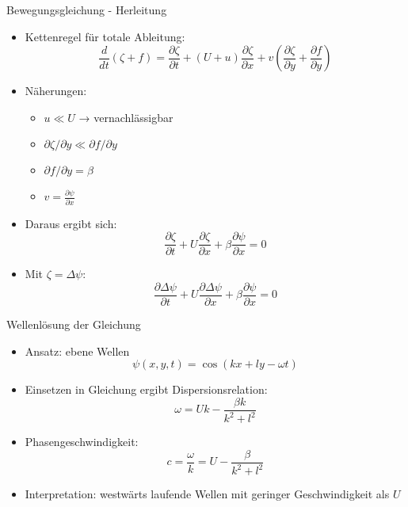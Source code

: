 \begin{frame}{Bewegungsgleichung - Herleitung}
	\begin{itemize}
		\item Kettenregel für totale Ableitung:
		      \[
			      \frac{d}{dt} (\zeta + f)
			      =
			      \frac{\partial \zeta}{\partial t}
			      + (U+u) \frac{\partial \zeta}{\partial x}
			      + v \left( \frac{\partial \zeta}{\partial y} + \frac{\partial f}{\partial y} \right)
		      \]
		\item Näherungen:
		      \begin{itemize}
			      \item \( u \ll U \) → vernachlässigbar
			      \item \( \partial \zeta / \partial y \ll \partial f / \partial y \)
			      \item \( \partial f / \partial y = \beta \)
			      \item \( v = \frac{\partial \psi}{\partial x} \)
		      \end{itemize}
		\item Daraus ergibt sich:
		      \[
			      \frac{\partial \zeta}{\partial t}
			      + U \frac{\partial \zeta}{\partial x}
			      + \beta \frac{\partial \psi}{\partial x} = 0
		      \]
		\item Mit \( \zeta = \Delta \psi \):
		      \[
			      \frac{\partial \Delta \psi}{\partial t}
			      + U \frac{\partial \Delta \psi}{\partial x}
			      + \beta \frac{\partial \psi}{\partial x} = 0
		      \]
	\end{itemize}
\end{frame}

\begin{frame}{Wellenlösung der Gleichung}
	\begin{itemize}
		\item Ansatz: ebene Wellen
		      \[
			      \psi(x, y, t) = \cos(kx + ly - \omega t)
		      \]
		\item Einsetzen in Gleichung ergibt Dispersionsrelation:
		      \[
			      \omega = Uk - \frac{\beta k}{k^2 + l^2}
		      \]
		\item Phasengeschwindigkeit:
		      \[
			      c = \frac{\omega}{k} = U - \frac{\beta}{k^2 + l^2}
		      \]
		\item Interpretation: westwärts laufende Wellen mit geringer Geschwindigkeit als \( U \)
	\end{itemize}
\end{frame}

      
